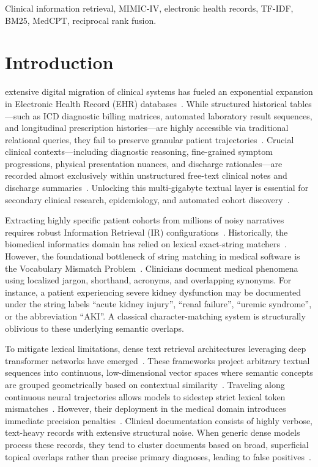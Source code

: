\documentclass[conference]{IEEEtran}
\begin{document}
\begin{IEEEkeywords}
Clinical information retrieval, MIMIC-IV, electronic health records, TF-IDF, BM25, MedCPT, reciprocal rank fusion.
\end{IEEEkeywords}

\section{Introduction}
 extensive digital migration of clinical systems has fueled an exponential expansion in Electronic Health Record (EHR) databases~\cite{johnson2023mimic}. While structured historical tables---such as ICD diagnostic billing matrices, automated laboratory result sequences, and longitudinal prescription histories---are highly accessible via traditional relational queries, they fail to preserve granular patient trajectories~\cite{devlin2019bert}. Crucial clinical contexts---including diagnostic reasoning, fine-grained symptom progressions, physical presentation nuances, and discharge rationales---are recorded almost exclusively within unstructured free-text clinical notes and discharge summaries~\cite{alsentzer2019clinicalbert}. Unlocking this multi-gigabyte textual layer is essential for secondary clinical research, epidemiology, and automated cohort discovery~\cite{reimers2019sentence}.

Extracting highly specific patient cohorts from millions of noisy narratives requires robust Information Retrieval (IR) configurations~\cite{salton1988term}. Historically, the biomedical informatics domain has relied on lexical exact-string matchers~\cite{robertson2009probabilistic}. However, the foundational bottleneck of string matching in medical software is the Vocabulary Mismatch Problem~\cite{agostinelli2024dense}. Clinicians document medical phenomena using localized jargon, shorthand, acronyms, and overlapping synonyms. For instance, a patient experiencing severe kidney dysfunction may be documented under the string labels ``acute kidney injury'', ``renal failure'', ``uremic syndrome'', or the abbreviation ``AKI''. A classical character-matching system is structurally oblivious to these underlying semantic overlaps.

To mitigate lexical limitations, dense text retrieval architectures leveraging deep transformer networks have emerged~\cite{reimers2019sentence}. These frameworks project arbitrary textual sequences into continuous, low-dimensional vector spaces where semantic concepts are grouped geometrically based on contextual similarity~\cite{lee2020biobert}. Traveling along continuous neural trajectories allows models to sidestep strict lexical token mismatches~\cite{jin2023medcpt}. However, their deployment in the medical domain introduces immediate precision penalties~\cite{fang2024information}. Clinical documentation consists of highly verbose, text-heavy records with extensive structural noise. When generic dense models process these records, they tend to cluster documents based on broad, superficial topical overlaps rather than precise primary diagnoses, leading to false positives~\cite{agostinelli2024dense}.
\end{document}
